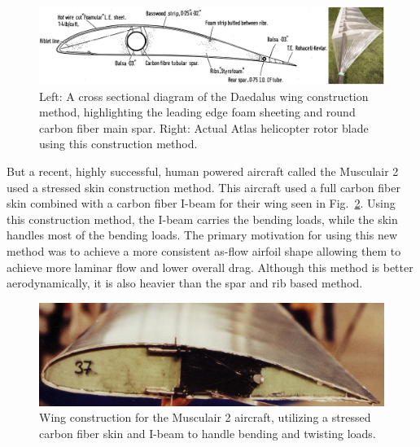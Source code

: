 \documentclass[]{aiaa-tc}
\begin{document}
        \begin{figure}[!hbt]
                \centering
                \includegraphics[width=.9\textwidth]{images/traditional-wing-construction}
                \caption{Left: A cross sectional diagram of the Daedalus wing construction method, highlighting the leading edge foam sheeting
                and round carbon fiber main spar. Right: Actual Atlas helicopter rotor blade using this construction method.}
                \label{fig:traditional-wing-construction}
        \end{figure}

        But a recent, highly successful, human powered aircraft called the Musculair 2 used a stressed skin construction
        method. This aircraft used a full carbon fiber skin combined with a carbon fiber I-beam for their wing seen in 
        Fig.~\ref{fig:musculair-wing-construction}. Using this construction method, the I-beam carries the bending loads, 
        while the skin handles most of the bending loads. The primary motivation for using this new method was to achieve 
        a more consistent as-flow airfoil shape allowing them to achieve more laminar flow and lower overall drag. Although 
        this method is better aerodynamically, it is also heavier than the spar and rib based method. 

        \begin{figure}[!hbt]
                \centering
                \includegraphics[width=.75\textwidth]{images/musculair2-wing-construction}
                \caption{Wing construction for the Musculair 2 aircraft, utilizing a stressed carbon fiber skin and I-beam 
                to handle bending and twisting loads.}
                \label{fig:musculair-wing-construction}
        \end{figure}
\end{document}
